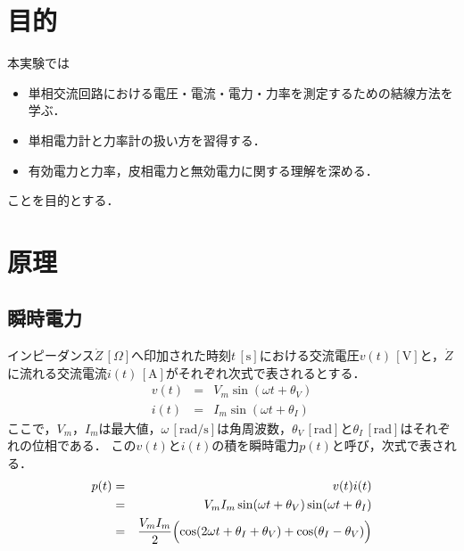 \documentclass[11pt,dvipdfmx]{ujarticle}
\begin{document}
\begin{jikkenTitle}
 \subTitle{} %
 \kyoudouII{} %
 \yoteibi{/ 　}%
 \yoteibiII{}%
 \yoteibiIII{}%
 \end{jikkenTitle}

\section{目的}
本実験では
\begin{itemize}
	\item 単相交流回路における電圧・電流・電力・力率を測定するための結線方法を学ぶ．
	\item 単相電力計と力率計の扱い方を習得する．
	\item 有効電力と力率，皮相電力と無効電力に関する理解を深める．
\end{itemize}
ことを目的とする．

\section{原理}
\subsection{瞬時電力}
インピーダンス$\dot{Z}\,[\Omega]$へ印加された時刻$t\,[\mathrm{s}]$における交流電圧$v(t)\,[\mathrm{V}]$と，$\dot{Z}$に流れる交流電流$i(t)\,[\mathrm{A}]$がそれぞれ次式で表されるとする．
\begin{eqnarray}
	v(t) &=& V_m\sin(\omega t+\theta_V)\\
	i(t) &=& I_m\sin(\omega t + \theta_I)
\end{eqnarray}
ここで，$V_m$，$I_m$は最大値，$\omega\,[\mathrm{rad/s}]$は角周波数，$\theta_V\,[\mathrm{rad}]$と$\theta_I\,[\mathrm{rad}]$はそれぞれの位相である．
この$v(t)$と$i(t)$の積を瞬時電力$p(t)$と呼び，次式で表される．
\begin{eqnarray}
	p(t)&=& v(t)i(t)\nonumber\\
	&=&V_mI_m\sin(\omega t+\theta_V)\sin(\omega t + \theta_I)\nonumber\\
	&=& \frac{V_mI_m}{2}\Bigl(\cos(2\omega t + \theta_I+\theta_V)+\cos(\theta_I - \theta_V)\Bigr)
	\label{eq:ip}
\end{eqnarray}
\end{document}
